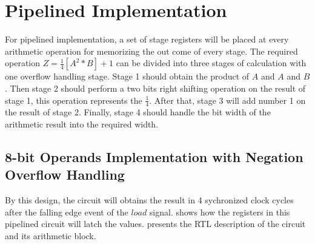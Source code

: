 \section{Pipelined Implementation}

For pipelined implementation, a set of stage registers will be placed at every arithmetic operation for memorizing the out come of every stage.
The required operation \textbf{\(Z = \frac{1}{4} [A^2\ast B] + 1\)} can be divided into three stages of calculation with one overflow handling stage.
Stage 1 should obtain the product of \(A\) and \(A\) and \(B\).
Then stage 2 should perform a two bits right shifting operation on the result of stage 1, this operation represents the \(\frac{1}{4}\).
After that, stage 3 will add number 1 on the result of stage 2.
Finally, stage 4 should handle the bit width of the arithmetic result into the required width.

\subsection{8-bit Operands Implementation with Negation Overflow Handling}

By this design, the circuit will obtains the result in 4 sychronized clock cycles after the falling edge event of the \(load\) signal.
 shows how the registers in this pipelined circuit will latch the values.
 presents the RTL description of the circuit and its arithmetic block.


